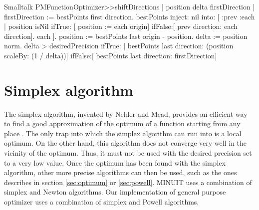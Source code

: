 \begin{displaycode}{Smalltalk}
PMFunctionOptimizer>>shiftDirections
    | position delta firstDirection |
    firstDirection := bestPoints first direction.
    bestPoints inject: nil
                    into: [ :prev :each |
                            position isNil
                                ifTrue: [ position := each origin]
                                ifFalse:[ prev direction: each
                                                           direction].
                            each
                            ].
    position := bestPoints last origin - position.
    delta := position norm.
    delta > desiredPrecision
        ifTrue: [ bestPoints last direction: (position scaleBy: (1 /
                                                              delta))]
        ifFalse:[ bestPoints last direction: firstDirection]
\end{displaycode}

\section{Simplex algorithm}
\label{sec:simplex} The simplex algorithm, invented by Nelder and
Mead, provides an efficient way to find a good approximation of
the optimum of a function starting from any place \cite{Press}.
The only trap into which the simplex algorithm can run into is a
local optimum. On the other hand, this algorithm does not converge
very well in the vicinity of the optimum. Thus, it must not be
used with the desired precision set to a very low value. Once the
optimum has been found with the simplex algorithm, other more
precise algorithms can then be used, such as the ones describes in
section \ref{sec:optimum} or \ref{sec:powell}. MINUIT uses a
combination of simplex and Newton algorithms. Our implementation
of general purpose optimizer uses a combination of simplex and
Powell algorithms.

